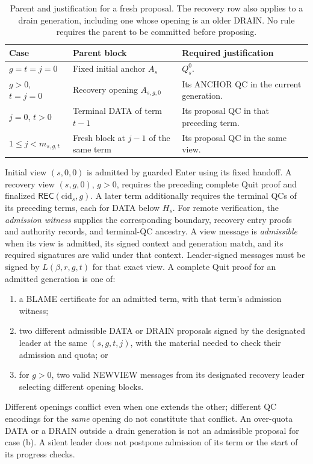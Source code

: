 \begin{table}[htbp]
\centering\small
\caption{Parent and justification for a fresh proposal. The recovery row
also applies to a drain generation, including one whose opening is an
older DRAIN. No rule requires the parent to be committed before proposing.}
\label{tab:parent-rule}
\begin{tabularx}{\linewidth}{@{}P{.22\linewidth}Y Y@{}}
\toprule
Case & Parent block & Required justification\\\midrule
$g=t=j=0$ & Fixed initial anchor $A_s$ & $Q_s^0$.\\
$g>0$, $t=j=0$ & Recovery opening $A_{s,g,0}$ & Its ANCHOR QC in the
current generation.\\
$j=0$, $t>0$ & Terminal DATA of term $t-1$ & Its proposal QC in that
preceding term.\\
$1\le j<m_{s,g,t}$ & Fresh block at $j-1$ of the same term & Its proposal
QC in the same view.\\
\bottomrule
\end{tabularx}
\end{table}

\begin{definition}
\label{def:admission-quit}
Initial view $(s,0,0)$ is admitted by guarded Enter using its fixed
handoff. A recovery view $(s,g,0)$, $g>0$, requires the preceding
complete Quit proof and finalized $\mathsf{REC}(\mathrm{cid}_s,g)$.
A later term additionally requires the terminal QCs of its preceding
terms, each for DATA below $H_s$. For remote verification, the
\emph{admission witness} supplies the corresponding boundary, recovery
entry proofs and authority records, and terminal-QC ancestry.
A view message is \emph{admissible} when its view is admitted, its
signed context and generation match, and its required signatures are
valid under that context. Leader-signed messages must be signed by
$L(\beta,r,g,t)$ for that exact view.
A complete Quit proof for an admitted generation is one of:
\begin{enumerate}[label=(\alph*)]
\item a BLAME certificate for an admitted term, with that term's
admission witness;
\item two different admissible DATA or DRAIN proposals signed by the
designated leader at the same $(s,g,t,j)$, with the material needed to
check their admission and quota; or
\item for $g>0$, two valid NEWVIEW messages from its designated recovery
leader selecting different opening blocks.
\end{enumerate}
\end{definition}
Different openings conflict even when one extends the other; different
QC encodings for the \emph{same} opening do not constitute that conflict.
An over-quota DATA or a DRAIN outside a drain generation is not an
admissible proposal for case (b). A silent leader does not postpone
admission of its term or the start of its progress checks.

